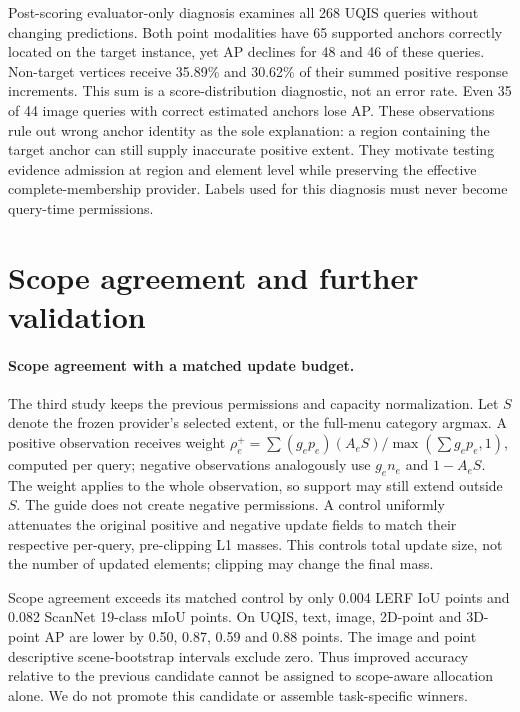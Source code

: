 \documentclass[10pt]{article}
\begin{document}
Post-scoring evaluator-only diagnosis examines all 268 UQIS queries without
changing predictions. Both point modalities have 65 supported anchors correctly
located on the target instance, yet AP declines for 48 and 46 of these queries.
Non-target vertices receive 35.89\% and 30.62\% of their summed positive response
increments. This sum is a score-distribution diagnostic, not an error rate.
Even 35 of 44 image queries with correct estimated anchors lose AP. These
observations rule out wrong anchor identity as the sole explanation: a region
containing the target anchor can still supply inaccurate positive extent.
They motivate testing evidence admission at region and element level while
preserving the effective complete-membership provider. Labels used for this
diagnosis must never become query-time permissions.

\section{Scope agreement and further validation}
\paragraph{Scope agreement with a matched update budget.}
The third study keeps the previous permissions and capacity normalization.
Let $S$ denote the frozen provider's selected extent, or the full-menu category
argmax. A positive observation receives weight
$\rho_e^+=\sum (g_ep_e)(A_eS)/\max(\sum g_ep_e,1)$, computed per query;
negative observations analogously use $g_en_e$ and $1-A_eS$. The weight applies to
the whole observation, so support may still extend outside $S$. The guide does
not create negative permissions. A control uniformly attenuates the original
positive and negative update fields to match their respective per-query,
pre-clipping L1 masses. This controls total update size, not the number of
updated elements; clipping may change the final mass.

\begin{table}[ht]
\centering\small
\resizebox{\linewidth}{!}{}
\caption{Third full-cohort study: extent agreement versus uniform attenuation
with matched signed correction budgets. Independent selected-set heads remain
fixed. Observable is the previous candidate, not a per-task fallback.}
\label{tab:support-agreement}
\end{table}

Scope agreement exceeds its matched control by only 0.004 LERF IoU points and
0.082 ScanNet 19-class mIoU points. On UQIS, text, image, 2D-point and 3D-point AP
are lower by 0.50, 0.87, 0.59 and 0.88 points. The image and point descriptive
scene-bootstrap intervals exclude zero. Thus improved accuracy relative to the
previous candidate cannot be assigned to scope-aware allocation alone. We do
not promote this candidate or assemble task-specific winners.
\end{document}
